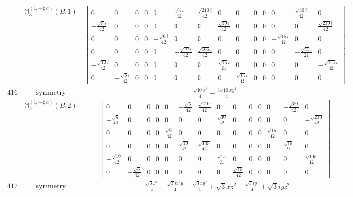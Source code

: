 \documentclass[fleqn,8pt,landscape]{jsarticle}
\begin{document}
\begin{longtable}{ccc}
$  $ & $ \mathbb{M}_{3}^{(1,-1;a)}(B,1) $ & $ \begin{bmatrix} 0 & 0 & 0 & 0 & 0 & \frac{\sqrt{5} i}{42} & \frac{\sqrt{210} i}{42} & 0 & 0 & 0 & 0 & 0 & \frac{\sqrt{30} i}{42} & 0 \\ - \frac{\sqrt{5} i}{42} & 0 & 0 & 0 & 0 & 0 & 0 & \frac{\sqrt{30} i}{42} & 0 & 0 & 0 & 0 & 0 & \frac{\sqrt{210} i}{42} \\ 0 & 0 & 0 & 0 & - \frac{\sqrt{6} i}{42} & 0 & 0 & 0 & 0 & 0 & 0 & - \frac{\sqrt{15} i}{42} & 0 & 0 \\ 0 & 0 & 0 & 0 & 0 & - \frac{\sqrt{10} i}{42} & \frac{\sqrt{105} i}{42} & 0 & 0 & 0 & 0 & 0 & - \frac{\sqrt{15} i}{21} & 0 \\ - \frac{\sqrt{10} i}{42} & 0 & 0 & 0 & 0 & 0 & 0 & \frac{\sqrt{15} i}{21} & 0 & 0 & 0 & 0 & 0 & - \frac{\sqrt{105} i}{42} \\ 0 & - \frac{\sqrt{6} i}{42} & 0 & 0 & 0 & 0 & 0 & 0 & \frac{\sqrt{15} i}{42} & 0 & 0 & 0 & 0 & 0 \end{bmatrix} $ \\ \hline
$ 416 $ & $ \text{symmetry} $ & $ \frac{\sqrt{10} x^{3}}{4} - \frac{3 \sqrt{10} x y^{2}}{4} $ \\
$  $ & $ \mathbb{M}_{3}^{(1,-1;a)}(B,2) $ & $ \begin{bmatrix} 0 & 0 & 0 & 0 & 0 & - \frac{\sqrt{5}}{42} & \frac{\sqrt{210}}{42} & 0 & 0 & 0 & 0 & 0 & - \frac{\sqrt{30}}{42} & 0 \\ - \frac{\sqrt{5}}{42} & 0 & 0 & 0 & 0 & 0 & 0 & \frac{\sqrt{30}}{42} & 0 & 0 & 0 & 0 & 0 & - \frac{\sqrt{210}}{42} \\ 0 & 0 & 0 & 0 & \frac{\sqrt{6}}{42} & 0 & 0 & 0 & 0 & 0 & 0 & \frac{\sqrt{15}}{42} & 0 & 0 \\ 0 & 0 & 0 & 0 & 0 & \frac{\sqrt{10}}{42} & \frac{\sqrt{105}}{42} & 0 & 0 & 0 & 0 & 0 & \frac{\sqrt{15}}{21} & 0 \\ - \frac{\sqrt{10}}{42} & 0 & 0 & 0 & 0 & 0 & 0 & \frac{\sqrt{15}}{21} & 0 & 0 & 0 & 0 & 0 & \frac{\sqrt{105}}{42} \\ 0 & - \frac{\sqrt{6}}{42} & 0 & 0 & 0 & 0 & 0 & 0 & \frac{\sqrt{15}}{42} & 0 & 0 & 0 & 0 & 0 \end{bmatrix} $ \\ \hline
$ 417 $ & $ \text{symmetry} $ & $ - \frac{\sqrt{3} x^{3}}{4} - \frac{\sqrt{3} i x^{2} y}{4} - \frac{\sqrt{3} x y^{2}}{4} + \sqrt{3} x z^{2} - \frac{\sqrt{3} i y^{3}}{4} + \sqrt{3} i y z^{2} $ \\

\end{longtable}
\end{document}
